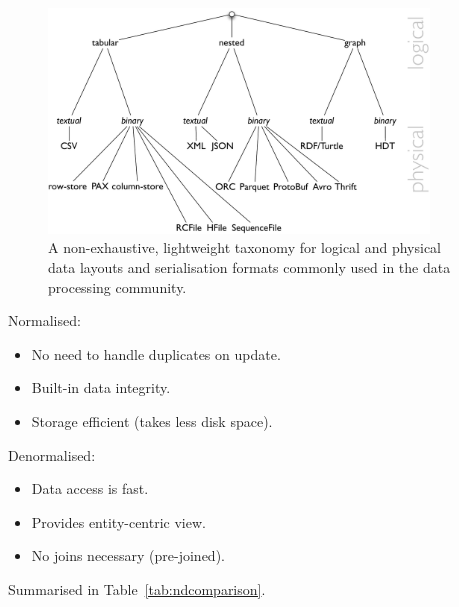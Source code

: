 \documentclass{llncs}
\begin{document}
\begin{figure}[h!]
\centering
\includegraphics[width=0.9\textwidth]{taxonomy-dl}
\caption{A non-exhaustive, lightweight taxonomy for logical and physical data 
layouts and serialisation formats commonly used in the data processing 
community.}
\label{fig:taxonomy-dl}
\end{figure}


Normalised:
\begin{itemize}
	\item No need to handle duplicates on update.
	\item Built-in data integrity.
	\item Storage efficient (takes less disk space).
\end{itemize}

Denormalised:
\begin{itemize}
	\item Data access is fast.
	\item Provides entity-centric view.
	\item No joins necessary (pre-joined).
\end{itemize}

Summarised in Table~\ref{tab:ndcomparison}.
\end{document}
